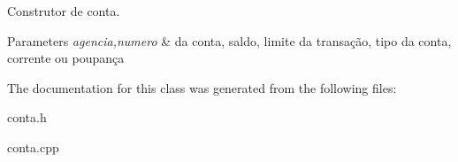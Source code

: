 Construtor de conta. 


\begin{DoxyParams}{Parameters}
{\em agencia,numero} & da conta, saldo, limite da transação, tipo da conta, corrente ou poupança \\
\hline
\end{DoxyParams}


The documentation for this class was generated from the following files\+:\begin{DoxyCompactItemize}
\item 
conta.\+h\item 
conta.\+cpp\end{DoxyCompactItemize}
